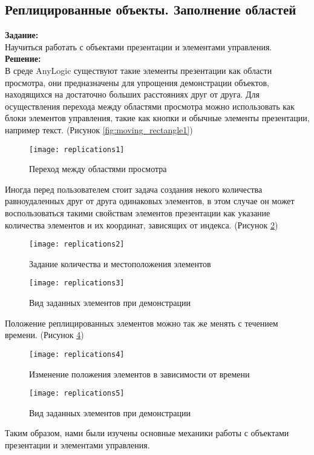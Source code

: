 \subsection*{Реплицированные объекты. Заполнение областей}

\textbf{Задание:}\\
Научиться работать с объектами презентации и элементами управления.\\

\textbf{Решение:}\\
В среде AnyLogic существуют такие элементы презентации как области просмотра, они предназначены для упрощения демонстрации объектов, находящихся на достаточно больших расстояниях друг от друга. Для осуществления перехода между областями просмотра можно использовать как блоки элементов управления, такие как кнопки и обычные элементы презентации, например текст. (Рисунок \ref{fig:moving_rectangle1})
\begin{figure}[h]
	\centering \texttt{[image: replications1]}
	\caption{Переход между областями просмотра}
	\label{fig:replications1}
\end{figure}

Иногда перед пользователем стоит задача создания некого количества равноудаленных друг от друга одинаковых элементов, в этом случае он может воспользоваться такими свойствам элементов презентации как указание количества элементов и их координат, зависящих от индекса. (Рисунок \ref{fig:replications2})
\begin{figure}[h]
	\centering \texttt{[image: replications2]}
	\caption{Задание количества и местоположения элементов}
	\label{fig:replications2}
\end{figure}

\begin{figure}[h]
	\centering \texttt{[image: replications3]}
	\caption{Вид заданных элементов при демонстрации}
	\label{fig:replications3}
\end{figure}

Положение реплицированных элементов можно так же менять с течением времени. (Рисунок \ref{fig:replications4})

\begin{figure}[h]
	\centering \texttt{[image: replications4]}
	\caption{Изменение положения элементов в зависимости от времени}
	\label{fig:replications4}
\end{figure}

\newpage

\begin{figure}[h]
	\centering \texttt{[image: replications5]}
	\caption{Вид заданных элементов при демонстрации}
	\label{fig:replications5}
\end{figure}

Таким образом, нами были изучены основные механики работы с объектами презентации и элементами управления.
